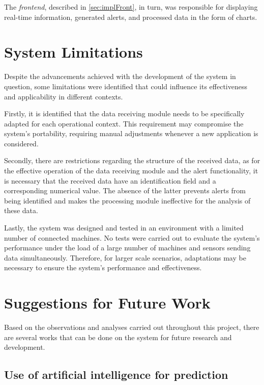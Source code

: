 The \emph{frontend}, described in \ref{sec:implFront}, in turn, was responsible for displaying real-time information, generated alerts, and processed data in the form of charts.


\section{System Limitations}\label{sec:limitations}

Despite the advancements achieved with the development of the system in question, some limitations were identified that could influence its effectiveness and applicability in different contexts.

Firstly, it is identified that the data receiving module needs to be specifically adapted for each operational context. This requirement may compromise the system's portability, requiring manual adjustments whenever a new application is considered.

Secondly, there are restrictions regarding the structure of the received data, as for the effective operation of the data receiving module and the alert functionality, it is necessary that the received data have an identification field and a corresponding numerical value. The absence of the latter prevents alerts from being identified and makes the processing module ineffective for the analysis of these data.

Lastly, the system was designed and tested in an environment with a limited number of connected machines. No tests were carried out to evaluate the system's performance under the load of a large number of machines and sensors sending data simultaneously. Therefore, for larger scale scenarios, adaptations may be necessary to ensure the system's performance and effectiveness.


\section{Suggestions for Future Work}\label{sec:future_work}

Based on the observations and analyses carried out throughout this project, there are several works that can be done on the system for future research and development.


\subsection{Use of artificial intelligence for prediction}

